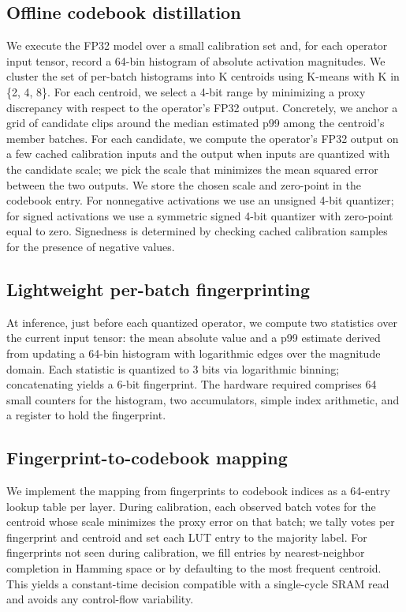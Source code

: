 \documentclass{article}
\begin{document}
\subsection{Offline codebook distillation}
We execute the FP32 model over a small calibration set and, for each operator input tensor, record a 64-bin histogram of absolute activation magnitudes. We cluster the set of per-batch histograms into K centroids using K-means with K in \{2, 4, 8\}. For each centroid, we select a 4-bit range by minimizing a proxy discrepancy with respect to the operator's FP32 output. Concretely, we anchor a grid of candidate clips around the median estimated p99 among the centroid's member batches. For each candidate, we compute the operator's FP32 output on a few cached calibration inputs and the output when inputs are quantized with the candidate scale; we pick the scale that minimizes the mean squared error between the two outputs. We store the chosen scale and zero-point in the codebook entry. For nonnegative activations we use an unsigned 4-bit quantizer; for signed activations we use a symmetric signed 4-bit quantizer with zero-point equal to zero. Signedness is determined by checking cached calibration samples for the presence of negative values.

\subsection{Lightweight per-batch fingerprinting}
At inference, just before each quantized operator, we compute two statistics over the current input tensor: the mean absolute value and a p99 estimate derived from updating a 64-bin histogram with logarithmic edges over the magnitude domain. Each statistic is quantized to 3 bits via logarithmic binning; concatenating yields a 6-bit fingerprint. The hardware required comprises 64 small counters for the histogram, two accumulators, simple index arithmetic, and a register to hold the fingerprint.

\subsection{Fingerprint-to-codebook mapping}
We implement the mapping from fingerprints to codebook indices as a 64-entry lookup table per layer. During calibration, each observed batch votes for the centroid whose scale minimizes the proxy error on that batch; we tally votes per fingerprint and centroid and set each LUT entry to the majority label. For fingerprints not seen during calibration, we fill entries by nearest-neighbor completion in Hamming space or by defaulting to the most frequent centroid. This yields a constant-time decision compatible with a single-cycle SRAM read and avoids any control-flow variability.
\end{document}
